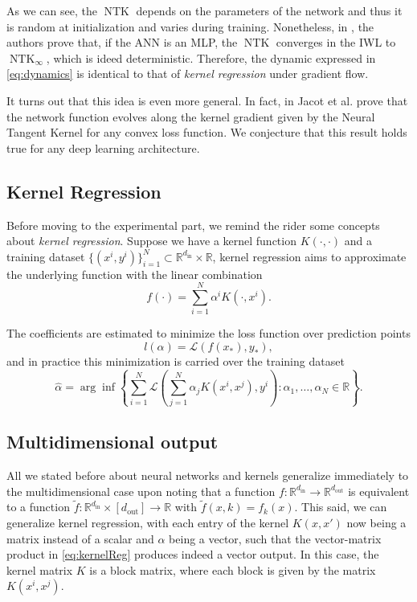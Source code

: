 \documentclass[11pt,notitlepage]{article}
\numberwithin{equation}{section}
\def\R{{\mathbb{R}}}
\DeclareMathOperator{\NTK}{NTK}
\theoremstyle{remark}
\theoremstyle{definition}
\begin{document}
	As we can see, the $\NTK$ depends on the parameters of the network and thus it is random at initialization and varies during training.
	Nonetheless, in \cite{jacot2018neural}, the authors prove that, if the ANN is an MLP, the $\NTK$ converges in the IWL to $\NTK_\infty$, which is ideed deterministic.
	Therefore, the dynamic expressed in \eqref{eq:dynamics} is identical to that of \emph{kernel regression} under gradient flow.
	
	It turns out that this idea is even more general.
	In fact, in \cite{jacot2018neural} Jacot et al. prove that the network function evolves along the kernel gradient given by the Neural Tangent Kernel for any convex loss function.
	We conjecture that this result holds true for any deep learning architecture.
	
	\subsection{Kernel Regression}\label{subsec:kernelRegression}
	
	Before moving to the experimental part, we remind the rider some concepts about \emph{kernel regression}.
	Suppose we have a kernel function $K(\cdot, \cdot)$ and a training dataset $\{(x^i, y^i)\}_{i=1}^N \subset \R^{d_\text{in}} \times \R$, kernel regression aims to approximate the underlying function with the linear combination
	\begin{equation}\label{eq:kernelReg}
		f(\cdot) = \sum_{i=1}^N \alpha^i K(\cdot, x^i).
	\end{equation}
	
	The coefficients are estimated to minimize the loss function over prediction points
	\begin{equation*}
		l(\alpha) = \mathcal{L}(f(x_*), y_*),
	\end{equation*}
	and in practice this minimization is carried over the training dataset
	\begin{equation}\label{eq:kernelCoeff}
		\widehat{\alpha} = \arg\inf\left\{\sum_{i=1}^N \mathcal{L}\left(\sum_{j=1}^N \alpha_j K(x^i,x^j), y^i\right) : \alpha_1,\dots, \alpha_N \in \R \right\}.
	\end{equation}
	
	\subsection{Multidimensional output}
	
	All we stated before about neural networks and kernels generalize immediately to the multi\-dimensional case upon noting that a function $f : \R^{d_\text{in}} \rightarrow \R^{d_\text{out}}$ is equivalent to a function $\tilde{f} : \R^{d_\text{in}} \times [d_\text{out}] \rightarrow \R$ with $\tilde{f}(x, k) = f_k(x)$.
	This said, we can generalize kernel regression, with each entry of the kernel $K(x, x')$ now being a matrix instead of a scalar and $\alpha$ being a vector, such that the vector-matrix product in \eqref{eq:kernelReg} produces indeed a vector output.
	In this case, the kernel matrix $K$ is a block matrix, where each block is given by the matrix $K(x^i, x^j)$.
	
\end{document}
